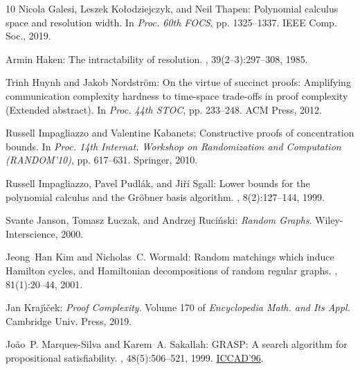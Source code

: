 \begin{thebibliography}{10}
{\sc Nicola Galesi, Leszek Kołodziejczyk, and Neil Thapen}: Polynomial
  calculus space and resolution width.
\newblock In {\em Proc. 60th FOCS}, pp. 1325--1337. IEEE Comp. Soc., 2019.

{\sc Armin Haken}: The intractability of resolution.
, 39(2--3):297--308, 1985.
\newblock [\epfmtdoi{10.1016/0304-3975(85)90144-6}]

{\sc Trinh Huynh and Jakob Nordstr\"om}: On the virtue of succinct proofs:
  Amplifying communication complexity hardness to time-space trade-offs in
  proof complexity ({E}xtended abstract).
\newblock In {\em Proc. 44th STOC}, pp. 233--248. ACM Press, 2012.
\newblock [\epfmtdoi{10.1145/2213977.2214000}]

{\sc Russell Impagliazzo and Valentine Kabanets}: Constructive proofs of
  concentration bounds.
\newblock In {\em Proc. 14th Internat. Workshop on Randomization and
  Computation (RANDOM'10)}, pp. 617--631. Springer, 2010.
\newblock [\epfmtdoi{10.1007/978-3-642-15369-3\_46}]

{\sc Russell Impagliazzo, Pavel Pudl{\'a}k, and Ji{\v{r}}{\'i} Sgall}: Lower
  bounds for the polynomial calculus and the {G}r{\"o}bner basis algorithm.
, 8(2):127--144, 1999.
\newblock [\epfmtdoi{10.1007/s000370050024}]

{\sc Svante Janson, Tomasz {\L}uczak, and Andrzej Ruci{\'n}ski}: {\em Random
  Graphs}.
\newblock Wiley-Interscience, 2000.
\newblock [\epfmtdoi{10.1002/9781118032718}]

{\sc Jeong~Han Kim and Nicholas~C. Wormald}: Random matchings which induce
  {H}amilton cycles, and {H}amiltonian decompositions of random regular graphs.
, 81(1):20--44, 2001.

{\sc Jan Kraj{\'\i}{\v{c}}ek}: {\em Proof Complexity}.
\newblock Volume 170 of {\em Encyclopedia Math. and Its Appl.}
\newblock Cambridge Univ. Press, 2019.
\newblock [\epfmtdoi{10.1017/9781108242066}]

{\sc Jo{\~a}o~P. {Marques-Silva} and Karem~A. Sakallah}: {GRASP}: A search
  algorithm for propositional satisfiability.
, 48(5):506--521, 1999.
\newblock \prelim \href{https://doi.org/10.1109/ICCAD.1996.569607}{ICCAD'96}.
\newblock [\epfmtdoi{10.1109/12.769433}]


\end{thebibliography}
